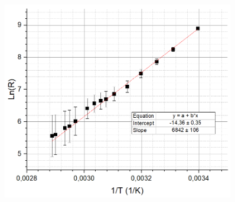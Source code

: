 \documentclass[a4paper, 14pt]{extarticle}%
\begin{document}
\begin{figure}[h]
\begin{center}
\includegraphics[width=0.9\textwidth]{gr}
\end{center}
\end{figure}
\end{document}
